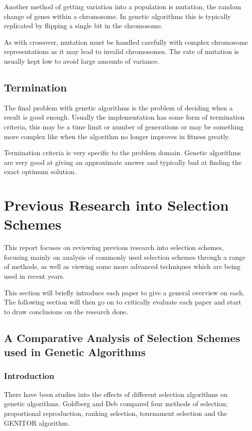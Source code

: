 \documentclass[10pt, a4paper]{article}
\begin{document}
Another method of getting variation into a population is mutation, the random
change of genes within a chromosome. In genetic algorithms this is typically
replicated by flipping a single bit in the chromosome.

As with crossover, mutation must be handled carefully with complex chromosome
representations as it may lead to invalid chromosomes. The rate of mutation 
is usually kept low to avoid large amounts of variance.


\subsection{Termination}

The final problem with genetic algorithms is the problem of deciding when a 
result is good enough. Usually the implementation has some form of termination
criteria, this may be a time limit or number of generations or may be something
more complex like when the algorithm no longer improves in fitness greatly.

Termination criteria is very specific to the problem domain. Genetic algorithms
are very good at giving an approximate answer and typically bad at finding the
exact optimum solution.

\FloatBarrier

\newpage
\section{Previous Research into Selection Schemes}
\label{sec:selection-algorithms}

This report focuses on reviewing previous research into selection schemes,
focusing mainly on analysis of commonly used selection schemes through a range
of methods, as well as viewing some more advanced techniques which are being
used in recent years.

This section will briefly introduce each paper to give a general overview on
each. The following section will then go on to critically evaluate each paper
and start to draw conclusions on the research done.

\subsection{A Comparative Analysis of Selection Schemes used in Genetic Algorithms}
\subsubsection{Introduction} 
There have been studies into the effects of different selection algorithms on 
genetic algorithms. Goldberg and Deb\cite{Goldberg1991Comparative} compared
four methods of selection; proportional reproduction, ranking selection,
tournament selection and the GENITOR algorithm\cite{Whitley1989GENITOR}.
\end{document}
